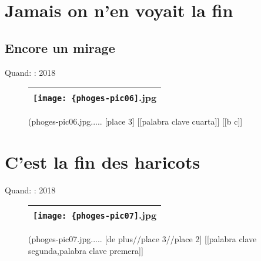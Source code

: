 \documentclass[12pt,twocolumn,french]{article}
\begin{document}
\section{Jamais on n'en voyait la fin}
%
%
\subsection{Encore un mirage}
%


Quand: : 2018

  \begin{figure}[H]
    \caption{
      (phoges-pic06.jpg.....
       [place 3] 
      [[palabra clave cuarta]] 
      [[b c]] 
    }
    \vspace{4mm}
    \label{phoges-pic06.jpg}
    \noindent \centering{}
    \begin{tabular}{|c|}
      \hline
          \texttt{[image: \{phoges-pic06]}.jpg}
        \tabularnewline \hline
    \end{tabular}
  \end{figure}
%
\section{C'est la fin des haricots}
%


Quand: : 2018

  \begin{figure}[H]
    \caption{
      (phoges-pic07.jpg.....
       [de plus//place 3//place 2] 
      [[palabra clave segunda,palabra clave premera]] 
    }
    \vspace{4mm}
    \label{phoges-pic07.jpg}
    \noindent \centering{}
    \begin{tabular}{|c|}
      \hline
          \texttt{[image: \{phoges-pic07]}.jpg}
        \tabularnewline \hline
    \end{tabular}
  \end{figure}
%
\end{document}
